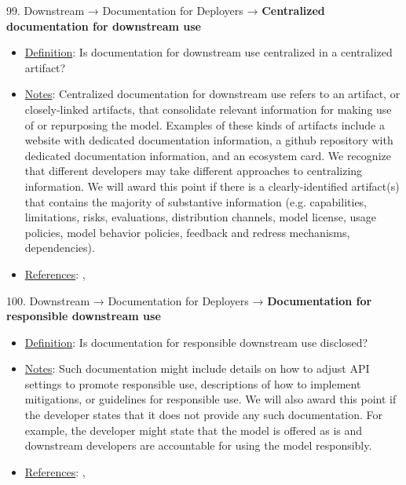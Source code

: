 99. Downstream → Documentation for Deployers → \textbf{Centralized documentation for downstream use}
\vspace{-\parskip}
\begin{itemize}
	\item
	\underline{Definition}: Is documentation for downstream use centralized in a centralized artifact?
	\item
	\underline{Notes}: Centralized documentation for downstream use refers to an artifact, or closely-linked artifacts, that consolidate relevant information for making use of or repurposing the model. Examples of these kinds of artifacts include a website with dedicated documentation information, a github repository with dedicated documentation information, and an ecosystem card. We recognize that different developers may take different approaches to centralizing information. We will award this point if there is a clearly-identified artifact(s) that contains the majority of substantive information (e.g. capabilities, limitations, risks, evaluations, distribution channels, model license, usage policies, model behavior policies, feedback and redress mechanisms, dependencies).
	\item
	\underline{References}: \citet{gebru2021datasheets}, \citet{mitchell2019model}
\end{itemize} \vspace{\baselineskip}


100. Downstream → Documentation for Deployers → \textbf{Documentation for responsible downstream use}
\vspace{-\parskip}
\begin{itemize}
	\item
	\underline{Definition}: Is documentation for responsible downstream use disclosed?
	\item
	\underline{Notes}: Such documentation might include details on how to adjust API settings to promote responsible use, descriptions of how to implement mitigations, or guidelines for responsible use. We will also award this point if the developer states that it does not provide any such documentation. For example, the developer might state that the model is offered as is and downstream developers are accountable for using the model responsibly.
	\item
	\underline{References}: \citet{bommasani2023ecosystem}, \citet{brown2023allocating}
\end{itemize} \vspace{\baselineskip}


\clearpage